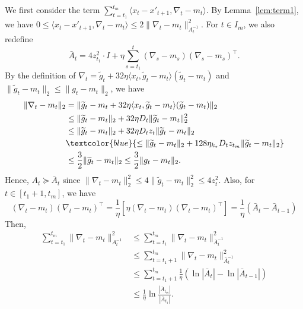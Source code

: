 \documentclass{article}
\theoremstyle{plain}
\theoremstyle{definition}
\theoremstyle{remark}
\newcommand{\bcomment}[1]{\textcolor{blue}{#1}}
\renewcommand{\tilde}{\widetilde}
\begin{document}
We first consider the term $\sum_{t=t_1}^{t_m}\langle x_{t}-x'_{t+1},\nabla_t-m_t\rangle$. By Lemma~\ref{lem:term1}, we have $0\leq\langle x_{t}-x'_{t+1},\nabla_t-m_t\rangle \leq 2\|\nabla_t-m_t\|_{A_t^{-1}}^2$. For $t\in I_m$, we also redefine 
\begin{equation*}
\bar{A}_t=4z_{t_1}^2\cdot I+\eta\sum_{s=t_1}^{t} (\nabla_s-m_s)(\nabla_s-m_s)^\top.
\end{equation*}
By the definition of $\nabla_t=\tilde{g}_t+32\eta\langle x_t,\tilde{g}_t-m_t\rangle(\tilde{g}_t-m_t)$ and $\|\tilde{g}_t-m_t\|_2\leq \|g_t-m_t\|_2$, we have
\begin{align*}
\|\nabla_t-m_t\|_2&=\|\tilde{g}_t-m_t+32\eta\langle x_t,\tilde{g}_t-m_t\rangle(\tilde{g}_t-m_t)\|_2\\
&\leq \|\tilde{g}_t-m_t\|_2+32\eta D_t\|\tilde{g}_t-m_t\|_2^2\\
&\leq \|\tilde{g}_t-m_t\|_2+32\eta D_t z_t\|\tilde{g}_t-m_t\|_2\\
&\bcomment{\leq \|\tilde{g}_t-m_t\|_2+128\eta_{k_\star} D_t z_{t_m}\|\tilde{g}_t-m_t\|_2} \\
&\leq \frac{3}{2} \|\tilde{g}_t-m_t\|_2\leq \frac{3}{2} \|g_t-m_t\|_2.
\end{align*}
Hence, $A_t\succeq \bar{A}_t$ since $\|\nabla_t-m_t\|_2^2\leq 4\|\tilde{g}_t-m_t\|_2^2\leq 4z_t^2$. Also, for $t\in[t_1+1,t_m]$, we have
\begin{equation*}
(\nabla_t-m_t)(\nabla_t-m_t)^\top=\frac{1}{\eta}[\eta(\nabla_t-m_t)(\nabla_t-m_t)^\top]=\frac{1}{\eta} (\bar{A}_t-\bar{A}_{t-1})
\end{equation*}
Then,
\begin{align*}
\sum_{t=t_1}^{t_m} \|\nabla_t-m_t\|_{A_t^{-1}}^2&\leq \sum_{t=t_1}^{t_m} \|\nabla_t-m_t\|_{\bar{A}_t^{-1}}^2\\
&\leq \sum_{t=t_1+1}^{t_m} \|\nabla_t-m_t\|_{\bar{A}_t^{-1}}^2\\
&\leq \sum_{t=t_1+1}^{t_m} \frac{1}{\eta}(\ln|\bar{A}_t|-\ln|\bar{A}_{t-1}|)\\
&\leq \frac{1}{\eta}\ln\frac{|\bar{A}_{t_m}|}{|\bar{A}_{t_1}|}.
\end{align*}
\end{document}
